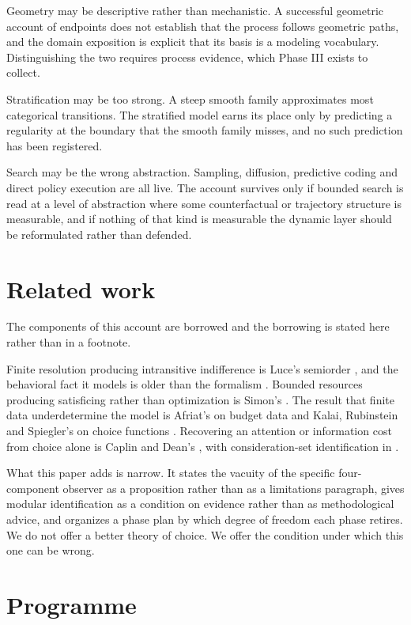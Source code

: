 \documentclass[11pt,letterpaper]{article}
\theoremstyle{plain}
\theoremstyle{definition}
\begin{document}
Geometry may be descriptive rather than mechanistic. A successful geometric
account of endpoints does not establish that the process follows geometric
paths, and the domain exposition is explicit that its basis is a modeling
vocabulary. Distinguishing the two requires process evidence, which Phase III
exists to collect.

Stratification may be too strong. A steep smooth family approximates most
categorical transitions. The stratified model earns its place only by predicting
a regularity at the boundary that the smooth family misses, and no such
prediction has been registered.

Search may be the wrong abstraction. Sampling, diffusion, predictive coding and
direct policy execution are all live. The account survives only if bounded
search is read at a level of abstraction where some counterfactual or trajectory
structure is measurable, and if nothing of that kind is measurable the dynamic
layer should be reformulated rather than defended.

\section{Related work}
\label{sec:related}

The components of this account are borrowed and the borrowing is stated here
rather than in a footnote.

Finite resolution producing intransitive indifference is Luce's semiorder
\cite{luce1956}, and the behavioral fact it models is older than the
formalism \cite{tversky1969}. Bounded resources producing satisficing rather
than optimization is Simon's \cite{simon1955}. The result that finite data
underdetermine the model is Afriat's on budget data \cite{afriat1967} and
Kalai, Rubinstein and Spiegler's on choice functions \cite{krs2002}. Recovering
an attention or information cost from choice alone is Caplin and Dean's
\cite{caplindean2015}, with consideration-set identification in
\cite{masatlioglu2012,manzini2007}.

What this paper adds is narrow. It states the vacuity of the specific
four-component observer as a proposition rather than as a limitations
paragraph, gives modular identification as a condition on evidence rather than
as methodological advice, and organizes a phase plan by which degree of freedom
each phase retires. We do not offer a better theory of choice. We offer the
condition under which this one can be wrong.

\section{Programme}
\end{document}
